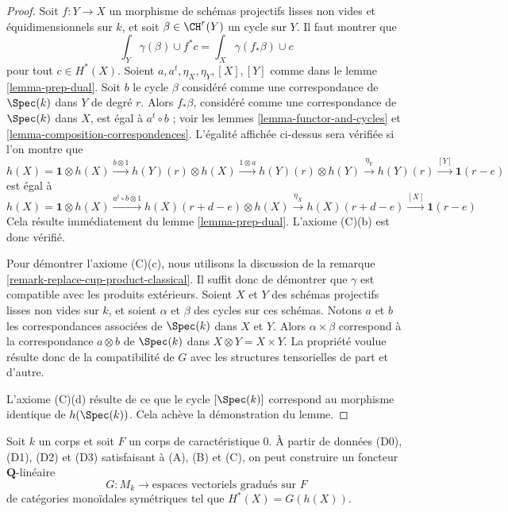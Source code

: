 \begin{proof}
\medskip\noindent
Soit $f : Y \to X$ un morphisme de schémas projectifs lisses
non vides et équidimensionnels sur $k$,
et soit $\beta \in \CH^r(Y)$ un cycle sur $Y$. Il faut montrer que
$$
\int_Y \gamma(\beta) \cup f^*c = \int_X \gamma(f_*\beta) \cup c
$$
pour tout $c \in H^*(X)$. Soient $a, a^t, \eta_X, \eta_Y, [X], [Y]$
comme dans le lemme \ref{lemma-prep-dual}.
Soit $b$ le cycle $\beta$ considéré comme une correspondance de $\Spec(k)$ dans $Y$
de degré $r$. Alors $f_*\beta$, considéré comme une correspondance de
$\Spec(k)$ dans $X$, est égal à $a^t \circ b$ ; voir
les lemmes \ref{lemma-functor-and-cycles} et
\ref{lemma-composition-correspondences}.
L'égalité affichée ci-dessus sera vérifiée si l'on montre que
$$
h(X) = \mathbf{1} \otimes h(X)
\xrightarrow{b \otimes 1}
h(Y)(r) \otimes h(X)
\xrightarrow{1 \otimes a}
h(Y)(r) \otimes h(Y)
\xrightarrow{\eta_Y}
h(Y)(r)
\xrightarrow{[Y]}
\mathbf{1}(r - e)
$$
est égal à
$$
h(X) = \mathbf{1} \otimes h(X)
\xrightarrow{a^t \circ b \otimes 1}
h(X)(r + d - e) \otimes h(X)
\xrightarrow{\eta_X}
h(X)(r + d - e)
\xrightarrow{[X]}
\mathbf{1}(r - e)
$$
Cela résulte immédiatement du lemme \ref{lemma-prep-dual}.
L'axiome (C)(b) est donc vérifié.

\medskip\noindent
Pour démontrer l'axiome (C)(c), nous utilisons la discussion de
la remarque \ref{remark-replace-cup-product-classical}.
Il suffit donc de démontrer que $\gamma$ est compatible avec
les produits extérieurs. Soient $X$ et $Y$ des schémas projectifs lisses
non vides sur $k$, et soient $\alpha$ et $\beta$ des cycles sur ces schémas. Notons
$a$ et $b$ les correspondances associées de $\Spec(k)$ dans
$X$ et $Y$. Alors $\alpha \times \beta$ correspond à
la correspondance $a \otimes b$ de $\Spec(k)$ dans $X \otimes Y = X \times Y$.
La propriété voulue résulte donc de la compatibilité de $G$
avec les structures tensorielles de part et d'autre.

\medskip\noindent
L'axiome (C)(d) résulte de ce que le cycle $[\Spec(k)]$
correspond au morphisme identique de $h(\Spec(k))$.
Cela achève la démonstration du lemme.
\end{proof}

\begin{lemma}
\label{lemma-from-weil-to-functor}
Soit $k$ un corps et soit $F$ un corps de caractéristique $0$. À partir de données
(D0), (D1), (D2) et (D3) satisfaisant à (A), (B) et (C),
on peut construire un foncteur $\mathbf{Q}$-linéaire
$$
G : M_k \longrightarrow \text{espaces vectoriels gradués sur }F\text{}
$$
de catégories monoïdales symétriques tel que $H^*(X) = G(h(X))$.
\end{lemma}

